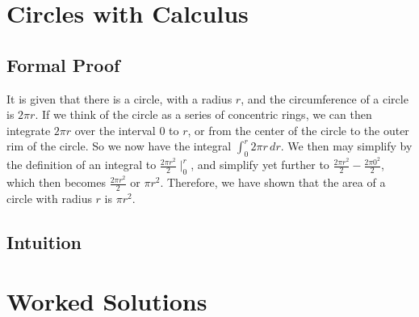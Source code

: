 \documentclass{book}
\begin{document}
\chapter{Circles with Calculus}
\section*{Formal Proof}
It is given that there is a circle, with a radius $r$, and the circumference of a circle is $2\pi r$. If we think of the circle as a series of concentric rings, we can then integrate $2\pi r$ over the interval $0$ to $r$, or from the center of the circle to the outer rim of the circle. So we now have the integral $\int^r_0 2\pi r\, dr$. We then may simplify by the definition of an integral to $\frac{2\pi r^2}{2}\mid^r_0$, and simplify yet further to $\frac{2\pi r^2}{2}-\frac{2\pi 0^2}{2}$, which then becomes $\frac{2\pi r^2}{2}$ or $\pi r^2$. Therefore, we have shown that the area of a circle with radius $r$ is $\pi r^2$.
\section*{Intuition}

\chapter{Worked Solutions}


\end{document}
